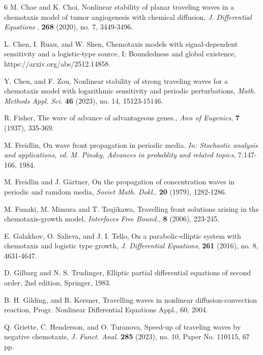 \documentclass[11pt]{article} %
\theoremstyle{remark}
\theoremstyle{remark}
\numberwithin{equation}{section}
\numberwithin{figure}{section}
\numberwithin{table}{section}
\begin{document}
\begin{thebibliography}{6}
 M. 
Chae and K.  Choi, 
Nonlinear stability of planar traveling waves in a chemotaxis model of tumor angiogenesis with chemical diffusion, {\it 
J. Differential Equations }, {\bf 268} (2020), no. 7, 3449-3496.

 L. Chen, I. Ruau,  and W. Shen, Chemotaxis models with signal-dependent sensitivity and a logistic-type source, I: Boundedness and global existence, https://arxiv.org/abs/2512.14858.


 Y.
Chen, and F. Zou, 
Nonlinear stability of strong traveling waves for a chemotaxis model with logarithmic sensitivity and periodic perturbations,
{\it Math. Methods Appl. Sci.} {\bf  46}  (2023), no. 14, 15123-15146.

 R. 
Fisher, The wave of advance of advantageous genes., {\it Ann of Eugenics}, {\bf 7} (1937), 
  335-369.




 M. Freidlin, On wave front propagation in periodic media.
{\it In: Stochastic analysis and applications, ed. M. Pinsky, Advances in probablity and
related topics}, 7:147-166, 1984.



 M. Freidlin and J. G\" artner, On the propagation of
concentration waves in periodic and ramdom media, {\it Soviet Math. Dokl.}, {\bf 20} (1979),  1282-1286.



 M. Funaki, M. Mimura and T. Tsujikawa, Travelling front solutions arising in the chemotaxis-growth model,
 {\it Interfaces Free Bound.}, {\bf 8} (2006), 223-245.



 E. 
Galakhov,  O.  Salieva, and J. I. Tello, 
On a parabolic-elliptic system with chemotaxis and logistic type growth,
{\it 
J. Differential Equations}, {\bf  261} (2016), no. 8, 4631-4647.


    
     D. Gilbarg and N. S.  Trudinger,
    Elliptic partial differential equations of second order,
    2nd edition,
    Springer, 1983.

 B. H. Gilding, and R. Kersner, 
Travelling waves in nonlinear diffusion-convection reaction, 
Progr. Nonlinear Differential Equations Appl., 60, 2004.

 Q. 
Griette, C. Henderson, and O. Turanova, 
Speed-up of traveling waves by negative chemotaxis, {\it 
J. Funct. Anal. } {\bf 285}  (2023), no. 10, Paper No. 110115, 67 pp.


\end{thebibliography}
\end{document}
